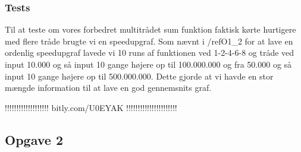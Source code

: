 \subsubsection{Tests}
\label{O1_Tests}
Til at teste om vores forbedret multitrådet sum funktion faktisk kørte hurtigere med flere tråde brugte vi en speedupgraf. Som nævnt i /ref{O1_2} for at lave en ordenlig speedupgraf lavede vi 10 runs af funktionen ved 1-2-4-6-8 og tråde ved input 10.000 og så input 10 gange højere op til 100.000.000 og fra 50.000 og så input 10 gange højere op til 500.000.000. Dette gjorde at vi havde en stor mængde information til at lave en god gennemsnits graf. 


!!!!!!!!!!!!!!!!!!!
bitly.com/U0EYAK
!!!!!!!!!!!!!!!!!!!!!!



\subsection{Opgave 2}

